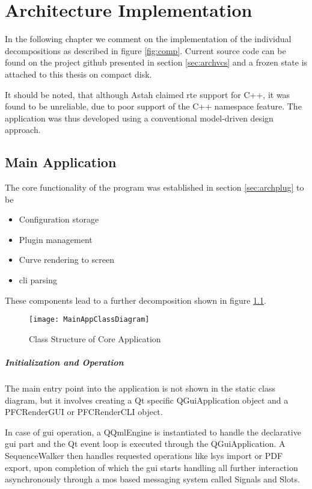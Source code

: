 \chapter{Architecture Implementation}
In the following chapter we comment on the implementation of the individual decompositions as described in figure \ref{fig:comp}.
Current source code can be found on the project \gls{github} presented in section \ref{sec:archvcs} and a frozen state is attached to this thesis on compact disk.

It should be noted, that although Astah claimed \gls{rte} support for C++, it was found to be unreliable, due to poor support of the C++ namespace feature.
The application was thus developed using a conventional model-driven design approach.

\section{Main Application}
The core functionality of the program was established in section \ref{sec:archplug} to be
\begin{itemize}
	\item Configuration storage
	\item Plugin management
	\item Curve rendering to screen
	\item \gls{cli} parsing
\end{itemize}

These components lead to a further decomposition shown in figure \ref{fig:main}.

\begin{figure}[htb]
	\texttt{[image: MainAppClassDiagram]}
	\caption{Class Structure of Core Application}
	\label{fig:main}
\end{figure} 

\paragraph{Initialization and Operation}
The main entry point into the application is not shown in the static class diagram, but it involves creating a Qt specific QGuiApplication object and a PFCRenderGUI or PFCRenderCLI object.

In case of \gls{gui} operation, a QQmlEngine is instantiated to handle the declarative \gls{gui} part and the Qt event loop is executed through the QGuiApplication. A SequenceWalker then handles requested operations like \gls{lsys} import or PDF export, upon completion of which the \gls{gui} starts handling all further interaction asynchronously through a \gls{mos} based messaging system called Signals and Slots.

